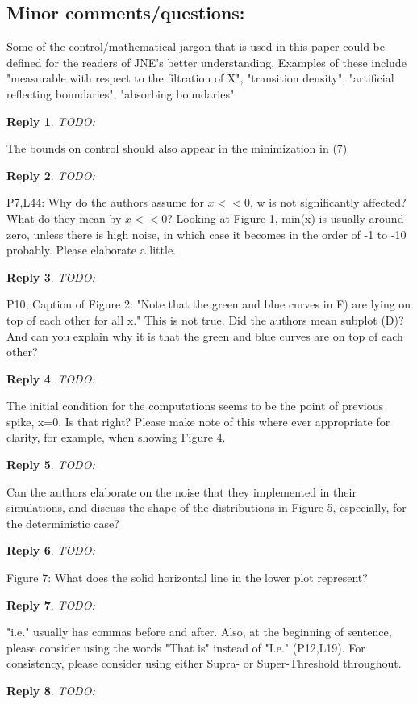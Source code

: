 \documentclass{article}
\newtheorem*{rep}{Reply}
\begin{document}
\subsection{Minor comments/questions:}

Some of the control/mathematical jargon that is used in this paper could be
defined for the readers of JNE's better understanding. Examples of these include
"measurable with respect to the filtration of X", "transition density",
"artificial reflecting boundaries", "absorbing boundaries" 
\begin{rep}
TODO:
\end{rep}
The bounds on control should also appear in the minimization in (7)
\begin{rep}
TODO:
\end{rep}

P7,L44: Why do the authors assume for $x<<0$, w is not significantly affected?
What do they mean by $x<<0$? Looking at Figure 1, min(x) is usually around zero,
unless there is high noise, in which case it becomes in the order of -1 to -10 probably. 
Please elaborate a little.
\begin{rep}
TODO:
\end{rep}
P10, Caption of Figure 2: "Note that the green and blue curves in F) are lying on top of each other for all x." This is not true. Did the authors mean subplot (D)? And can you explain why it is that the green and blue curves are on top of each other?
\begin{rep}
TODO:
\end{rep}
The initial condition for the computations seems to be the point of previous spike, x=0. Is that right? Please make note of this where ever appropriate for clarity, for example, when showing Figure 4.
\begin{rep}
TODO:
\end{rep}
Can the authors elaborate on the noise that they implemented in their simulations, and discuss the shape of the distributions in Figure 5, especially, for the deterministic case?
\begin{rep}
TODO:
\end{rep}
Figure 7: What does the solid horizontal line in the lower plot represent?
\begin{rep}
TODO:
\end{rep}
"i.e." usually has commas before and after. Also, at the beginning of sentence, please consider using the words "That is" instead of "I.e." (P12,L19).
For consistency, please consider using either Supra- or Super-Threshold throughout.
\begin{rep}
TODO:
\end{rep}
\end{document}
